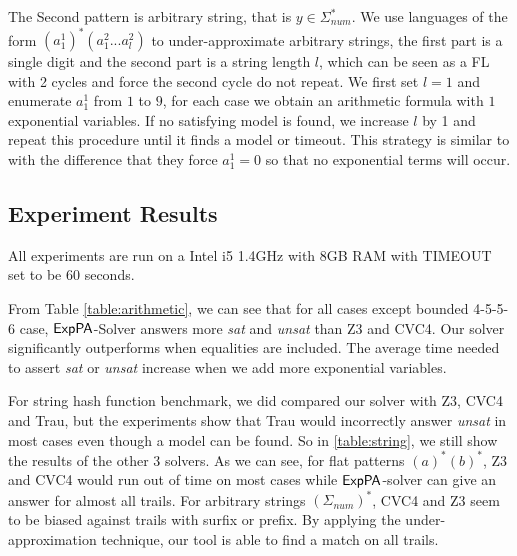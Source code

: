 The Second pattern is arbitrary string, that is $y\in \Sigma_{num}^*$. We use languages of the form $(a^1_1)^* (a^2_1...a^2_l)$ to under-approximate arbitrary strings, the first part is a single digit and the second part is a string length $l$, which can be seen as a FL with 2 cycles and force the second cycle do not repeat. We first set $l=1$ and enumerate $a^1_1$ from $1$ to $9$, for each case we obtain an arithmetic formula with $1$ exponential variables. If no satisfying model is found, we increase $l$ by 1 and repeat this procedure until it finds a model or timeout. This strategy is similar to \cite{Abdulla2020} with the difference that they force $a^1_1=0$ so that no exponential terms will occur.

\subsection{Experiment Results}

All experiments are run on a Intel i5 1.4GHz with 8GB RAM with TIMEOUT set to be 60 seconds. 


From Table \ref{table:arithmetic}, we can see that for all cases except bounded 4-5-5-6 case, ${\sf ExpPA}$-Solver answers more \textit{sat} and \textit{unsat} than Z3 and CVC4. Our solver significantly outperforms when equalities are included. The average time needed to assert \textit{sat} or \textit{unsat} increase when we add more exponential variables.


For string hash function benchmark, we did compared our solver with Z3, CVC4 and Trau, but the experiments show that Trau would incorrectly answer \textit{unsat} in most cases even though a model can be found. So in \ref{table:string}, we still show the results of the other 3 solvers. As we can see, for flat patterns $(a)^*(b)^*$, Z3 and CVC4 would run out of time on most cases while ${\sf ExpPA}$-solver can give an answer for almost all trails. For arbitrary strings $(\Sigma_{num})^*$, CVC4 and Z3 seem to be biased against trails with surfix or prefix. By applying the under-approximation technique, our tool is able to find a match on all trails. 


